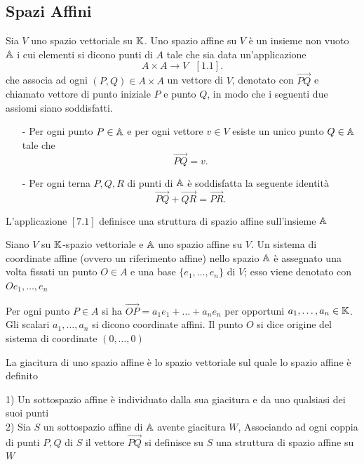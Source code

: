 \documentclass[12px]{article}
\begin{document}
	\subsection{Spazi Affini}
	\begin{defi}
		Sia $V$ uno spazio vettoriale su $\mathbb{K}$. Uno spazio affine su $V$ è un insieme non vuoto $\mathbb{A}$ i cui elementi si dicono punti di $A$ tale che sia data un'applicazione
		\[
			A\times A \rightarrow V \ \ \ [1.1]
		.\] 
		che associa ad ogni $(P,Q)\in A\times A$ un vettore di  $V$, denotato con $ \overrightarrow{PQ}$ e chiamato vettore di punto iniziale $P$ e punto  $Q$, in modo che i seguenti due assiomi siano soddisfatti.
		\begin{itemize}
			\item[-] Per ogni punto $P\in \mathbb{A}$ e per ogni vettore $v\in V$ esiste un unico punto $Q\in \mathbb{A}$ tale che
				\[
				 \overrightarrow{PQ} = v
				.\]  
			\item[-] Per ogni terna $P,Q,R$ di punti di $\mathbb{A}$ è soddisfatta la seguente identità
				\[
				 \overrightarrow{PQ}+\overrightarrow{QR}=\overrightarrow{PR}
				.\] 
		\end{itemize}
				L'applicazione $[7.1]$ definisce una struttura di spazio affine sull'insieme  $\mathbb{A}$
	\end{defi}
	\begin{defi}
		Siano $V$ su $\mathbb{K}$-spazio vettoriale e $\mathbb{A}$ uno spazio affine su $V$. Un sistema di coordinate affine (ovvero un riferimento affine) nello spazio $\mathbb{A}$ è assegnato una volta fissati un punto $O\in A$ e una base $ \{e_1,\ldots,e_n\}$ di $V$; esso viene denotato con $Oe_1,\ldots,e_n$
	\end{defi}
	\begin{defi}
		Per ogni punto $P\in A$ si ha $ \overrightarrow{OP} = a_1e_1+\ldots+a_ne_n$ per opportuni $a_1,\ldots, a_n\in \mathbb{K}$.\\
		Gli scalari $a_1,\ldots,a_n$ si dicono coordinate affini. Il punto $O$ si dice origine del sistema di coordinate $(0,\ldots,0)$
	\end{defi}
	\begin{defi}[Giacitura]
		La giacitura di uno spazio affine è lo spazio vettoriale sul quale lo spazio affine è definito
	\end{defi}
	\newpage
	\begin{prop}
		1) Un sottospazio affine è individuato dalla sua giacitura e da uno qualsiasi dei suoi punti\\
		2) Sia $S$ un sottospazio affine di $\mathbb{A}$ avente giacitura $W$, Associando ad ogni coppia di punti $P,Q$ di $S$ il vettore $\overrightarrow{PQ}$ si definisce su $S$ una struttura di spazio affine su $W$
	\end{prop}
\end{document}
